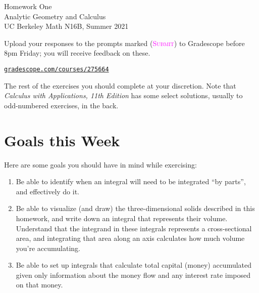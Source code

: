 

\usepackage{fourier}



\pagestyle{empty}




\begin{center}
    {\Huge{Homework One}}
    \\ \footnotesize{Analytic Geometry and Calculus}
    \\ \footnotesize{UC Berkeley Math N16B, Summer 2021}
\end{center}
\vspace{2em}

Upload your responses to the prompts marked
(\textsc{\textcolor{magenta}{Submit}})
to Gradescope before 8pm Friday; 
you will receive feedback on these.
\begin{center}
    \href{https://www.gradescope.com/courses/275664}%
    {\texttt{gradescope.com/courses/275664}}
\end{center}
The rest of the exercises you should complete at your discretion.
Note that \emph{Calculus with Applications, 11th Edition} 
has some select solutions, usually to odd-numbered exercises, in the back.


\section*{Goals this Week}

Here are some goals you should have in mind while exercising:
\begin{enumerate}
    \item Be able to identify when an integral will need to be
        integrated ``by parts'', and effectively do it.
    \item Be able to visualize (and draw) the three-dimensional solids
        described in this homework, and write down an integral
        that represents their volume. Understand that the integrand
        in these integrals represents a cross-sectional area, 
        and integrating that area along an axis
        calculates how much volume you're accumulating.
    \item Be able to set up integrals that calculate total capital (money)
        accumulated given only information about the money flow
        and any interest rate imposed on that money.
\end{enumerate}

